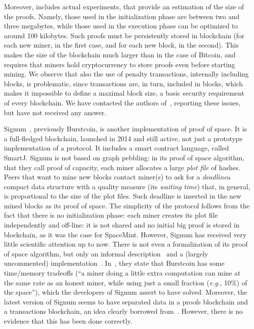 Moreover, \cite{ParkKFGAP18} includes actual experiments, that provide an estimation of the size of the proofs.
Namely, those used in the initialization phase are between two and three megabytes, while those used
in the execution phase can be optimized to around 100 kilobytes. Such proofs must be persistently stored in
blockchain (for each new miner, in the first case, and for each new block, in the second).
This makes the size of the blockchain much larger than in the case of Bitcoin, and requires
that miners hold cryptocurrency to store proofs even before starting mining.
We observe that also the use of penalty transactions, internally including blocks, is problematic, since
transactions are, in turn, included in blocks, which makes it impossible to define
a maximal block size, a basic security requirement of every blockchain.
We have contacted the authors of~\cite{ParkKFGAP18}, reporting these issues,
but have not received any answer.

Signum~\cite{Signum}, previously Burstcoin, is another implementation of proof of space.
It is a full-fledged blockchain, launched in 2014 and still active,
not just a prototype implementation of a protocol. It includes a smart contract language, called SmartJ.
Signum is not based on graph pebbling: in its proof of space algorithm, that they
call proof of capacity, each miner allocates a large \emph{plot file} of hashes.
Peers that want to mine new blocks contact miner(s) to ask for a
\emph{deadline}\ie a compact data structure with a quality measure (its \emph{waiting time}) that,
in general, is proportional to the size of the plot files. Such deadline is
inserted in the new mined blocks as its proof of space. The simplicity of the protocol
follows from the fact that there is no initialization phase: each miner creates its plot file
independently and off-line: it is not shared and no initial big proof is stored in
blockchain, as it was the case for SpaceMint.
However, Signum has received very little scientific
attention up to now. There is not even a formalization of its proof of space algorithm,
but only an informal description~\cite{SignumPlotting} and a (largely uncommented)
implementation~\cite{SignumSource}.
In~\cite{ParkKFGAP18}, they state that Burstcoin has some
time/memory tradeoffs (``a miner doing a little extra computation can mine at the same
rate as an honest miner, while using just a small fraction (\emph{e.g.}, 10\%) of the space''),
which the developers of Signum assert to have solved. Moreover, the latest version of Signum
seems to have separated data in a proofs blockchain and a transactions blockchain,
an idea clearly borrowed from~\cite{ParkKFGAP18}. However, there is no evidence that this has been done
correctly.
